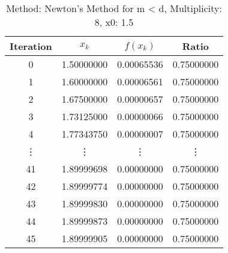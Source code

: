\begin{table}
\centering
\caption{Method: Newton's Method for m < d, Multiplicity: 8, x0: 1.5}
\label{tab:table_Newton's_Method_for_m_<_d_8_1_5}
\begin{tabular}{c c c c}
\toprule
Iteration &      $x_k$ &   $f(x_k)$ &      Ratio \\
\midrule
        0 & 1.50000000 & 0.00065536 & 0.75000000 \\
        1 & 1.60000000 & 0.00006561 & 0.75000000 \\
        2 & 1.67500000 & 0.00000657 & 0.75000000 \\
        3 & 1.73125000 & 0.00000066 & 0.75000000 \\
        4 & 1.77343750 & 0.00000007 & 0.75000000 \\
   \vdots &     \vdots &     \vdots &     \vdots \\
       41 & 1.89999698 & 0.00000000 & 0.75000000 \\
       42 & 1.89999774 & 0.00000000 & 0.75000000 \\
       43 & 1.89999830 & 0.00000000 & 0.75000000 \\
       44 & 1.89999873 & 0.00000000 & 0.75000000 \\
       45 & 1.89999905 & 0.00000000 & 0.75000000 \\
\bottomrule
\end{tabular}
\end{table}

